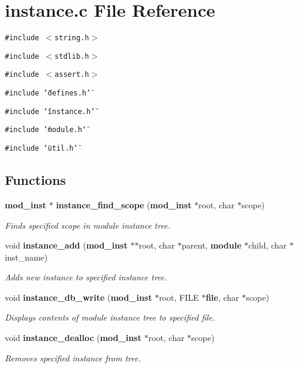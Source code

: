 \section{instance.c File Reference}
\label{instance_8c}
{\tt \#include $<$string.h$>$}\par
{\tt \#include $<$stdlib.h$>$}\par
{\tt \#include $<$assert.h$>$}\par
{\tt \#include \char`\"{}defines.h\char`\"{}}\par
{\tt \#include \char`\"{}instance.h\char`\"{}}\par
{\tt \#include \char`\"{}module.h\char`\"{}}\par
{\tt \#include \char`\"{}util.h\char`\"{}}\par
\subsection*{Functions}
\begin{CompactItemize}
\item 
{\bf mod\_\-inst} $\ast$ {\bf instance\_\-find\_\-scope} ({\bf mod\_\-inst} $\ast$root, char $\ast$scope)
\begin{CompactList}\small\item\em Finds specified scope in module instance tree.\item\end{CompactList}\item 
void {\bf instance\_\-add} ({\bf mod\_\-inst} $\ast$$\ast$root, char $\ast$parent, {\bf module} $\ast$child, char $\ast$inst\_\-name)
\begin{CompactList}\small\item\em Adds new instance to specified instance tree.\item\end{CompactList}\item 
void {\bf instance\_\-db\_\-write} ({\bf mod\_\-inst} $\ast$root, FILE $\ast${\bf file}, char $\ast$scope)
\begin{CompactList}\small\item\em Displays contents of module instance tree to specified file.\item\end{CompactList}\item 
void {\bf instance\_\-dealloc} ({\bf mod\_\-inst} $\ast$root, char $\ast$scope)
\begin{CompactList}\small\item\em Removes specified instance from tree.\item\end{CompactList}\end{CompactItemize}


